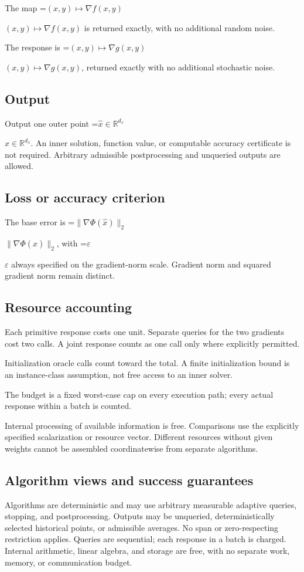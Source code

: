 \documentclass[10pt,a4paper]{article}
\newcommand{\AtlasMath}[1]{\par\begingroup\centering\setbox0=\hbox{$\displaystyle #1$}\ifdim\wd0>1.4\linewidth\typeout{ATLAS WIDE FORMULA: \the\wd0}\fi\ifdim\wd0>\linewidth\resizebox{\linewidth}{!}{\box0}\else\box0\fi\par\endgroup}
\newcommand{\AtlasInlineMath}[1]{\begingroup\setbox0=\hbox{$#1$}\ifdim\wd0>.4\linewidth\endgroup\AtlasMath{#1}\else\endgroup$#1$\fi}
\begin{document}
The map \AtlasInlineMath{(x,y)\mapsto\nabla f(x,y)} is returned exactly, with no additional random noise.

The response is \AtlasInlineMath{(x,y)\longmapsto \nabla g(x,y)}, returned exactly with no additional stochastic noise.

\subsection{Output}
Output one outer point \AtlasInlineMath{\widehat{x}\in\mathbb{R}^{d_x}}. An inner solution, function value, or computable accuracy certificate is not required. Arbitrary admissible postprocessing and unqueried outputs are allowed.

\subsection{Loss or accuracy criterion}
The base error is \AtlasInlineMath{\|\nabla\Phi(\widehat{x})\|_2}, with \AtlasInlineMath{\varepsilon} always specified on the gradient-norm scale. Gradient norm and squared gradient norm remain distinct.

\subsection{Resource accounting}
Each primitive response costs one unit. Separate queries for the two gradients cost two calls. A joint response counts as one call only where explicitly permitted.

Initialization oracle calls count toward the total. A finite initialization bound is an instance-class assumption, not free access to an inner solver.

The budget is a fixed worst-case cap on every execution path; every actual response within a batch is counted.

Internal processing of available information is free. Comparisons use the explicitly specified scalarization or resource vector. Different resources without given weights cannot be assembled coordinatewise from separate algorithms.

\subsection{Algorithm views and success guarantees}
Algorithms are deterministic and may use arbitrary measurable adaptive queries, stopping, and postprocessing. Outputs may be unqueried, deterministically selected historical points, or admissible averages. No span or zero-respecting restriction applies. Queries are sequential; each response in a batch is charged. Internal arithmetic, linear algebra, and storage are free, with no separate work, memory, or communication budget.
\end{document}
